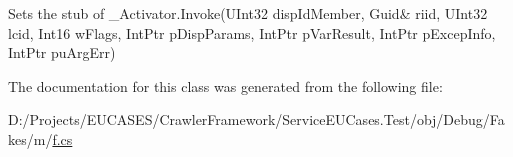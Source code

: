Sets the stub of \-\_\-\-Activator.\-Invoke(U\-Int32 disp\-Id\-Member, Guid\& riid, U\-Int32 lcid, Int16 w\-Flags, Int\-Ptr p\-Disp\-Params, Int\-Ptr p\-Var\-Result, Int\-Ptr p\-Excep\-Info, Int\-Ptr pu\-Arg\-Err)



The documentation for this class was generated from the following file\-:\begin{DoxyCompactItemize}
\item 
D\-:/\-Projects/\-E\-U\-C\-A\-S\-E\-S/\-Crawler\-Framework/\-Service\-E\-U\-Cases.\-Test/obj/\-Debug/\-Fakes/m/\hyperlink{m_2f_8cs}{f.\-cs}\end{DoxyCompactItemize}
